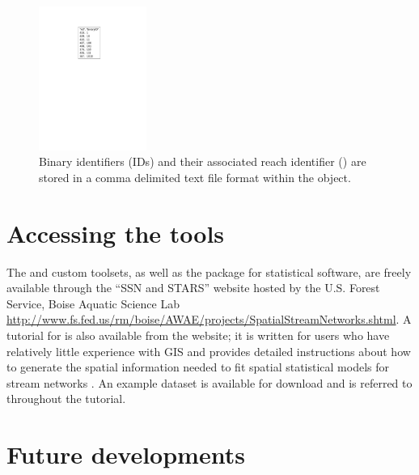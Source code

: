 \documentclass[article]{jss}
\begin{document}
\begin{figure}[htbp]
  \begin{center}
    \includegraphics[width=100pt,keepaspectratio]{Figures/Fig8.pdf}
  \end{center}
  \caption{Binary identifiers (IDs) and their associated reach identifier () are stored in a comma delimited text file format within the  object. \label{Fig8}}
\end{figure}

%
%

\section{Accessing the tools}

The  and  custom  toolsets, as
well as the  package for  statistical software,
are freely available through the ``SSN and STARS'' website hosted by
the U.S. Forest Service, Boise Aquatic Science Lab
\url{http://www.fs.fed.us/rm/boise/AWAE/projects/SpatialStreamNetworks.shtml}. A
tutorial for  \citep{Pete:STAR:2011} is also available from the website; it is written for users who have relatively little experience with GIS and provides detailed instructions about how to generate the spatial information needed to fit spatial statistical models for stream networks \citep{Ver:Pete:Move:2010}. An example dataset is available for download and is referred to throughout the tutorial.

%
%

\section{Future developments}
\end{document}
